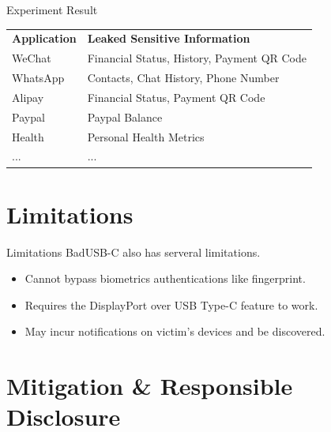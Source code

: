 \documentclass{beamer}
\begin{document}
\begin{frame}{Experiment Result}
	\begin{table}[htbp]
		\begin{tabular}{|l|l}
			\textbf{Application}         & \textbf{Leaked Sensitive Information} 		     \\
			WeChat      		         & Financial Status, History, Payment QR Code        \\
			WhatsApp                     & Contacts, Chat History, Phone Number              \\
			Alipay          			 & Financial Status, Payment QR Code                 \\
			Paypal 						 & Paypal Balance      							     \\                              
			Health                       & Personal Health Metrics                           \\
			...                          & ...                                               \\
		\end{tabular}
	\end{table}
\end{frame}
\section{Limitations}
\begin{frame}{Limitations}
	BadUSB-C also has serveral limitations.
	\begin{itemize}
		\item Cannot bypass biometrics authentications like fingerprint.
		\item Requires the DisplayPort over USB Type-C feature to work.
		\item May incur notifications on victim's devices and be discovered.
	\end{itemize}
\end{frame}
\section{Mitigation \& Responsible Disclosure}
\end{document}
